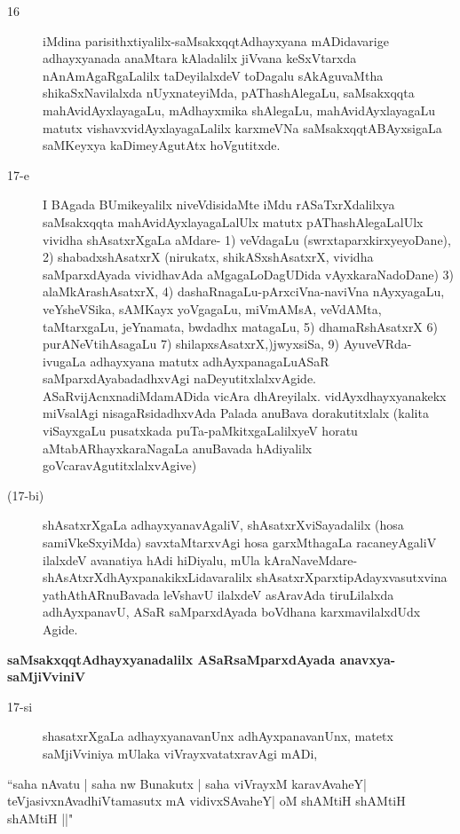\begin{description}
\item[16] iMdina parisithxtiyalilx-saMsakxqqtAdhayxyana mADidavarige adhayxyanada anaM\-tara kAladalilx jiVvana keSxVtarxda nAnAmAgaRgaLalilx taDeyilalxdeV toDagalu sAkA\-guvaMtha shikaSxNavilalxda nUyxnateyiMda, pAThashAlegaLu, saMsakxqqta mahA\-vidAyx\-layagaLu, mAdhayxmika shAlegaLu, mahAvidAyxlayagaLu matutx vishavxvidAyx\-layagaLalilx karxmeVNa saMsakxqqtABAyxsigaLa saMKeyxya kaDimeyAgutAtx hoVgutitxde.

\item[17-e] I BAgada BUmikeyalilx niveVdisidaMte iMdu rASaTxrXdalilxya saMsakxqqta mahAvidAyxlayagaLalUlx matutx pAThashAlegaLalUlx vividha shAsatxrXgaLa \hbox{aMdare-}
1) veVdagaLu (swrxtaparxkirxyeyoDane), 2) shabadxshAsatxrX (nirukatx, shikASxshAsatxrX, vividha saMparxdAyada vividhavAda aMgagaLoDagUDida vAyxkaraNa\-doDane) 3) alaMkArashAsatxrX, 4) dashaRnagaLu-pArxciVna-naviVna nAyxyagaLu, veYsheV\-Sika, sAMKayx yoVgagaLu, miVmAMsA, veVdAMta, taMtarxgaLu, jeYnamata, bwdadhx matagaLu, 
5) dhamaRshAsatxrX 6) purANeVtihAsagaLu 7) shilapxsAsatxrX,)jwyxsiSa, 9) AyuveVRda-ivugaLa adhayxyana matutx adhAyxpanagaLu\break ASaR saMparxdAyabadadhxvAgi naDeyutitxlalxvAgide. ASaR\-vijAcnxnadiMda\break \hbox{mADida} vicAra dhAreyilalx. vidAyxdhayxyanakekx miVsalAgi nisagaRsidadhx\-vAda Palada anuBava doraku\-titxlalx (kalita viSayxgaLu pusatxkada puTa-paMkitxgaLalilxyeV horatu aMtabARhayxkaraNagaLa anuBavada hAdi\-yalilx goVcaravAgutitxlalx\-vAgive)

\item[(17-bi)] shAsatxrXgaLa adhayxyanavAgaliV, shAsatxrXviSayadalilx (hosa samiVkeSxyiMda) savxtaMtarxvAgi hosa garxMthagaLa racaneyAgaliV ilalxdeV avanatiya hAdi hiDiyalu, mUla kAraNaveMdare-\-shAsAtxrXdhAyxpanakikxLidavaralilx shAsatxrXparxti\-pAdayx\-vasutxvina yathAthARnuBavada leVshavU ilalxdeV asAra\-vAda tiruLilalxda adhAyxpanavU, ASaR saMparxdAyada boVdhana karxmavilalxdUdx Agide.
\end{description}
{\medskip
\noindent
{\large\bf saMsakxqqtAdhayxyanadalilx ASaRsaMparxdAyada anavxya-saMjiVviniV}}\label{page45}

\begin{description}
\item[17-si] shasatxrXgaLa adhayxyanavanUnx adhAyxpanavanUnx, matetx saMjiVviniya mUlaka viVrayxvatatxravAgi mADi,
\end{description}
\begin{shloka}
``saha nAvatu | saha nw Bunakutx | saha viVrayxM karavAvaheY|\\\label{46}
teVjasivxnAvadhiVtamasutx mA vidivxSAvaheY| oM shAMtiH shAMtiH shAMtiH ||"
\end{shloka}
\smallskip

